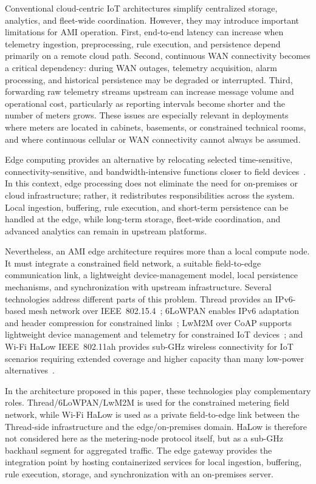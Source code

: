 \documentclass[conference]{IEEEtran}
\begin{document}
Conventional cloud-centric IoT architectures simplify centralized storage, analytics, and fleet-wide coordination. However, they may introduce important limitations for AMI operation. First, end-to-end latency can increase when telemetry ingestion, preprocessing, rule execution, and persistence depend primarily on a remote cloud path. Second, continuous WAN connectivity becomes a critical dependency: during WAN outages, telemetry acquisition, alarm processing, and historical persistence may be degraded or interrupted. Third, forwarding raw telemetry streams upstream can increase message volume and operational cost, particularly as reporting intervals become shorter and the number of meters grows. These issues are especially relevant in deployments where meters are located in cabinets, basements, or constrained technical rooms, and where continuous cellular or WAN connectivity cannot always be assumed.

Edge computing provides an alternative by relocating selected time-sensitive, connectivity-sensitive, and bandwidth-intensive functions closer to field devices~\cite{satyanarayananEmergenceEdgeComputing2017,minhEdgeComputingIoTEnabled2022}. In this context, edge processing does not eliminate the need for on-premises or cloud infrastructure; rather, it redistributes responsibilities across the system. Local ingestion, buffering, rule execution, and short-term persistence can be handled at the edge, while long-term storage, fleet-wide coordination, and advanced analytics can remain in upstream platforms.

Nevertheless, an AMI edge architecture requires more than a local compute node. It must integrate a constrained field network, a suitable field-to-edge communication link, a lightweight device-management model, local persistence mechanisms, and synchronization with upstream infrastructure. Several technologies address different parts of this problem. Thread provides an IPv6-based mesh network over IEEE~802.15.4~\cite{ThreadGroup1-4-0}; 6LoWPAN enables IPv6 adaptation and header compression for constrained links~\cite{RFC6282}; LwM2M over CoAP supports lightweight device management and telemetry for constrained IoT devices~\cite{OMA_LwM2M2020,RFC7252}; and Wi-Fi HaLow IEEE~802.11ah provides sub-GHz wireless connectivity for IoT scenarios requiring extended coverage and higher capacity than many low-power alternatives~\cite{IEEE802.11ah-2016,qiaoSurveyWiFiHaLow2018,tianWiFiHaLowInternet2021}.

In the architecture proposed in this paper, these technologies play complementary roles. Thread/6LoWPAN/LwM2M is used for the constrained metering field network, while Wi-Fi HaLow is used as a private field-to-edge link between the Thread-side infrastructure and the edge/on-premises domain. HaLow is therefore not considered here as the metering-node protocol itself, but as a sub-GHz backhaul segment for aggregated traffic. The edge gateway provides the integration point by hosting containerized services for local ingestion, buffering, rule execution, storage, and synchronization with an on-premises server.
\end{document}
